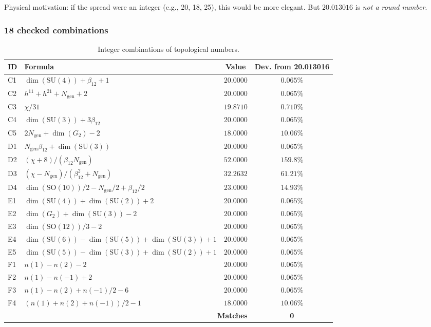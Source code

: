\documentclass[11pt,a4paper]{article}
\newcommand{\SU}{\ensuremath{\mathrm{SU}}}
\newcommand{\SO}{\ensuremath{\mathrm{SO}}}
\theoremstyle{definition}
\begin{document}
\medskip\noindent
Physical motivation: if the spread were an integer
(e.g., 20, 18, 25), this would be more elegant. But
$20.013016$ is \emph{not a round number}.

\subsubsection{18 checked combinations}

\begin{table}[ht]
\centering
\caption{Integer combinations of topological numbers.}
\label{tab:integer-combinations}
\begin{tabular}{llcc}
\toprule
ID & Formula & Value & Dev. from 20.013016 \\
\midrule
C1 & $\dim(\SU(4)) + \beta_{12} + 1$ & $20.0000$ & $0.065\%$ \\
C2 & $h^{11} + h^{21} + N_{\text{gen}} + 2$ & $20.0000$ & $0.065\%$ \\
C3 & $\chi/31$ & $19.8710$ & $0.710\%$ \\
C4 & $\dim(\SU(3)) + 3\beta_{12}$ & $20.0000$ & $0.065\%$ \\
C5 & $2 N_{\text{gen}} + \dim(G_2) - 2$ & $18.0000$ & $10.06\%$ \\
D1 & $N_{\text{gen}} \beta_{12} + \dim(\SU(3))$ & $20.0000$ & $0.065\%$ \\
D2 & $(\chi + 8)/(\beta_{12} N_{\text{gen}})$ & $52.0000$ & $159.8\%$ \\
D3 & $(\chi - N_{\text{gen}})/(\beta_{12}^2 + N_{\text{gen}})$ & $32.2632$ & $61.21\%$ \\
D4 & $\dim(\SO(10))/2 - N_{\text{gen}}/2 + \beta_{12}/2$ & $23.0000$ & $14.93\%$ \\
E1 & $\dim(\SU(4)) + \dim(\SU(2)) + 2$ & $20.0000$ & $0.065\%$ \\
E2 & $\dim(G_2) + \dim(\SU(3)) - 2$ & $20.0000$ & $0.065\%$ \\
E3 & $\dim(\SO(12))/3 - 2$ & $20.0000$ & $0.065\%$ \\
E4 & $\dim(\SU(6)) - \dim(\SU(5)) + \dim(\SU(3)) + 1$ & $20.0000$ & $0.065\%$ \\
E5 & $\dim(\SU(5)) - \dim(\SU(3)) + \dim(\SU(2)) + 1$ & $20.0000$ & $0.065\%$ \\
F1 & $n(1) - n(2) - 2$ & $20.0000$ & $0.065\%$ \\
F2 & $n(1) - n(-1) + 2$ & $20.0000$ & $0.065\%$ \\
F3 & $n(1) - n(2) + n(-1)/2 - 6$ & $20.0000$ & $0.065\%$ \\
F4 & $(n(1) + n(2) + n(-1))/2 - 1$ & $18.0000$ & $10.06\%$ \\
\midrule
\multicolumn{3}{r}{\textbf{Matches}} & \textbf{0} \\
\bottomrule
\end{tabular}
\end{table}
\end{document}
